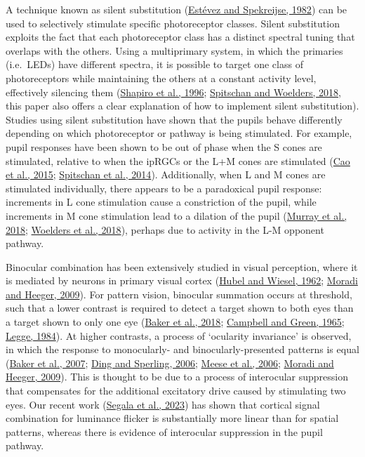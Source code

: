 \documentclass[
]{article}
\begin{document}
A technique known as silent substitution (\protect\hyperlink{ref-Estevez1982}{Estévez and Spekreijse, 1982}) can be used to selectively stimulate specific photoreceptor classes. Silent substitution exploits the fact that each photoreceptor class has a distinct spectral tuning that overlaps with the others. Using a multiprimary system, in which the primaries (i.e.~LEDs) have different spectra, it is possible to target one class of photoreceptors while maintaining the others at a constant activity level, effectively silencing them (\protect\hyperlink{ref-Shapiro1996}{Shapiro et al., 1996}; \protect\hyperlink{ref-Spitschan2018}{Spitschan and Woelders, 2018}, this paper also offers a clear explanation of how to implement silent substitution). Studies using silent substitution have shown that the pupils behave differently depending on which photoreceptor or pathway is being stimulated. For example, pupil responses have been shown to be out of phase when the S cones are stimulated, relative to when the ipRGCs or the L+M cones are stimulated (\protect\hyperlink{ref-Cao2015}{Cao et al., 2015}; \protect\hyperlink{ref-Spitschan2014}{Spitschan et al., 2014}). Additionally, when L and M cones are stimulated individually, there appears to be a paradoxical pupil response: increments in L cone stimulation cause a constriction of the pupil, while increments in M cone stimulation lead to a dilation of the pupil (\protect\hyperlink{ref-Murray2018}{Murray et al., 2018}; \protect\hyperlink{ref-Woelders2018}{Woelders et al., 2018}), perhaps due to activity in the L-M opponent pathway.

Binocular combination has been extensively studied in visual perception, where it is mediated by neurons in primary visual cortex (\protect\hyperlink{ref-Hubel1962}{Hubel and Wiesel, 1962}; \protect\hyperlink{ref-Moradi2009}{Moradi and Heeger, 2009}). For pattern vision, binocular summation occurs at threshold, such that a lower contrast is required to detect a target shown to both eyes than a target shown to only one eye (\protect\hyperlink{ref-Baker2018}{Baker et al., 2018}; \protect\hyperlink{ref-Campbell1965}{Campbell and Green, 1965}; \protect\hyperlink{ref-Legge1984}{Legge, 1984}). At higher contrasts, a process of `ocularity invariance' is observed, in which the response to monocularly- and binocularly-presented patterns is equal (\protect\hyperlink{ref-Baker2007}{Baker et al., 2007}; \protect\hyperlink{ref-Ding2006}{Ding and Sperling, 2006}; \protect\hyperlink{ref-Meese2006}{Meese et al., 2006}; \protect\hyperlink{ref-Moradi2009}{Moradi and Heeger, 2009}). This is thought to be due to a process of interocular suppression that compensates for the additional excitatory drive caused by stimulating two eyes. Our recent work (\protect\hyperlink{ref-Segala2023}{Segala et al., 2023}) has shown that cortical signal combination for luminance flicker is substantially more linear than for spatial patterns, whereas there is evidence of interocular suppression in the pupil pathway.
\end{document}

